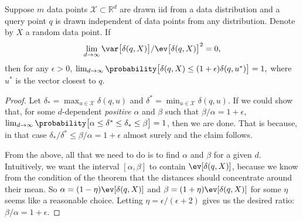 \begin{theorem}
\label{theorem:instability:beyer}
    Suppose $m$ data points $\mathcal{X} \subset \mathbb{R}^d$ are drawn iid from a data distribution
    and a query point $q$ is drawn independent of data points from any distribution.
    Denote by $X$ a random data point. If
    \begin{equation*}
        \lim_{d \rightarrow \infty} \var\big[ \delta(q, X) \big] / \ev\big[ \delta(q, X) \big]^2 = 0,
    \end{equation*}
    then for any $\epsilon > 0$,
    $\lim_{d \rightarrow \infty} \probability\big[ \delta(q, X) \leq (1 + \epsilon) \delta(q, u^\ast) \big] = 1,$
    where $u^\ast$ is the vector closest to $q$.
\end{theorem}
\begin{proof}
    Let $\delta_\ast = \max_{u \in \mathcal{X}} \delta(q, u)$ and $\delta^\ast = \min_{u \in \mathcal{X}} \delta(q, u)$.
    If we could show that, for some $d$-dependent \emph{positive} $\alpha$ and $\beta$ such that $\beta/\alpha = 1 + \epsilon$,
    $\lim_{d \rightarrow \infty} \probability\big[ \alpha \leq \delta^\ast \leq \delta_\ast \leq \beta \big] = 1$,
    then we are done. That is because, in that case $\delta_\ast/\delta^\ast \leq \beta / \alpha = 1 + \epsilon$ almost surely
    and the claim follows.
    
    From the above, all that we need to do is to find $\alpha$ and $\beta$ for a given $d$.
    Intuitively, we want the interval $[\alpha, \beta]$ to contain $\ev[\delta(q, X)]$, because
    we know from the condition of the theorem that the distances should concentrate around their mean.
    So $\alpha = (1 - \eta) \ev[\delta(q, X)]$ and $\beta = (1 + \eta) \ev[\delta(q, X)]$ for some $\eta$
    seems like a reasonable choice. Letting $\eta = \epsilon / (\epsilon + 2)$ gives us the desired ratio:
    $\beta/\alpha = 1 + \epsilon$.
    

\end{proof}
